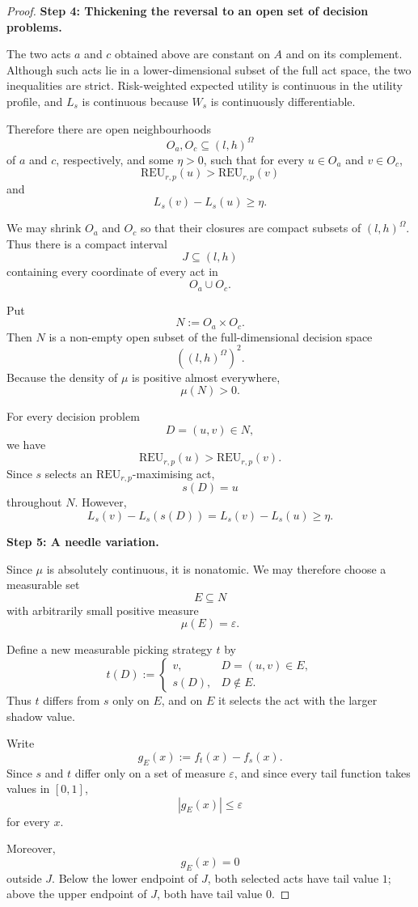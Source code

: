 \documentclass[a4paper,final]{article}
\newcommand\REU{\mathrm{REU}}
\renewcommand{\leq}{\leqslant}
\renewcommand{\geq}{\geqslant}
\newenvironment{CCM rewritten}
{\begingroup\color{blue}} %
{\endgroup}              %
\begin{document}
\begin{proof}
\medskip
\noindent
\textbf{Step 4: Thickening the reversal to an open set of decision
problems.}

The two acts \(a\) and \(c\) obtained above are constant on \(A\) and
on its complement. Although such acts lie in a lower-dimensional
subset of the full act space, the two inequalities are strict.
Risk-weighted expected utility is continuous in the utility profile,
and \(L_s\) is continuous because \(W_s\) is continuously
differentiable.

Therefore there are open neighbourhoods
\[
O_a,O_c\subseteq(l,h)^\Omega
\]
of \(a\) and \(c\), respectively, and some \(\eta>0\), such that for
every \(u\in O_a\) and \(v\in O_c\),
\[
\REU_{r,p}(u)>\REU_{r,p}(v)
\]
and
\[
L_s(v)-L_s(u)\geq\eta.
\]

We may shrink \(O_a\) and \(O_c\) so that their closures are compact
subsets of \((l,h)^\Omega\). Thus there is a compact interval
\[
J\subseteq(l,h)
\]
containing every coordinate of every act in
\[
O_a\cup O_c.
\]

Put
\[
N:=O_a\times O_c.
\]
Then \(N\) is a non-empty open subset of the full-dimensional
decision space
\[
((l,h)^\Omega)^2.
\]
Because the density of \(\mu\) is positive almost everywhere,
\[
\mu(N)>0.
\]

For every decision problem
\[
D=(u,v)\in N,
\]
we have
\[
\REU_{r,p}(u)>\REU_{r,p}(v).
\]
Since \(s\) selects an \(\REU_{r,p}\)-maximising act,
\[
s(D)=u
\]
throughout \(N\). However,
\[
L_s(v)-L_s(s(D))
=
L_s(v)-L_s(u)
\geq\eta.
\]

\medskip
\noindent
\textbf{Step 5: A needle variation.}

Since \(\mu\) is absolutely continuous, it is nonatomic. We may
therefore choose a measurable set
\[
E\subseteq N
\]
with arbitrarily small positive measure
\[
\mu(E)=\varepsilon.
\]

Define a new measurable picking strategy \(t\) by
\[
t(D)
:=
\begin{cases}
v, & D=(u,v)\in E,\\
s(D), & D\notin E.
\end{cases}
\]
Thus \(t\) differs from \(s\) only on \(E\), and on \(E\) it selects
the act with the larger shadow value.

Write
\[
g_E(x):=f_t(x)-f_s(x).
\]
Since \(s\) and \(t\) differ only on a set of measure \(\varepsilon\),
and since every tail function takes values in \([0,1]\),
\[
|g_E(x)|\leq\varepsilon
\]
for every \(x\).

Moreover,
\[
g_E(x)=0
\]
outside \(J\). Below the lower endpoint of \(J\), both selected acts
have tail value \(1\); above the upper endpoint of \(J\), both have
tail value \(0\).


\end{proof}
\end{document}
